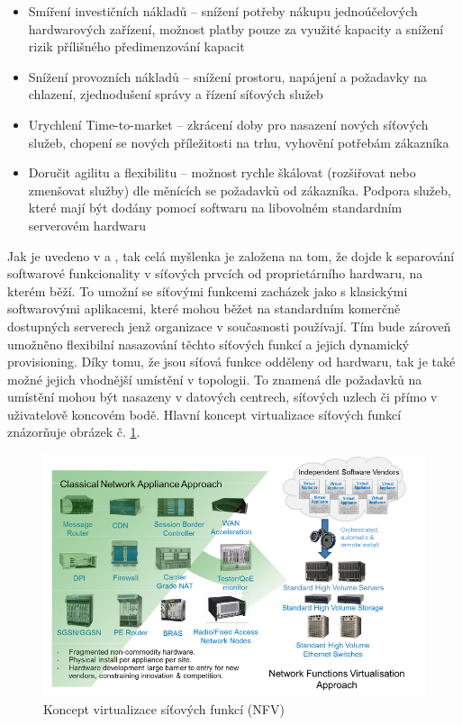 \begin{itemize}
\item Smíření investičních nákladů – snížení potřeby nákupu jednoúčelových hardwarových zařízení, možnost platby pouze za využité kapacity a snížení rizik přílišného předimenzování kapacit
\item Snížení provozních nákladů – snížení prostoru, napájení a požadavky na chlazení, zjednodušení správy a řízení síťových služeb
\item Urychlení Time-to-market – zkrácení doby pro nasazení nových síťových služeb, chopení se nových příležitosti na trhu, vyhovění potřebám zákazníka
\item Doručit agilitu a flexibilitu – možnost rychle škálovat (rozšiřovat nebo zmenšovat služby) dle měnících se požadavků od zákazníka. Podpora služeb, které mají být dodány pomocí softwaru na libovolném standardním serverovém hardwaru
\end{itemize}

Jak je uvedeno v \cite{NFVState} a \cite{NFVChalanges}, tak celá myšlenka je založena na tom, že dojde k separování softwarové funkcionality v síťových prvcích od proprietárního hardwaru, na kterém běží. To umožní se síťovými funkcemi zacházek jako s klasickými softwarovými aplikacemi, které mohou běžet na standardním komerčně dostupných serverech jenž organizace v současnosti používají. Tím bude zároveň umožněno flexibilní nasazování těchto síťových funkcí a jejich dynamický provisioning. Díky tomu, že jsou síťová funkce odděleny od hardwaru, tak je také možné jejich vhodnější umístění v topologii. To znamená dle požadavků na umístění mohou být nasazeny v datových centrech, síťových uzlech či přímo v uživatelově koncovém bodě. Hlavní koncept virtualizace síťových funkcí znázorňuje obrázek č. \ref{fig:vize_NFV}. 

\begin{figure}[h]
\begin{centering}
\includegraphics[scale=0.5]{images/vize_NFV}
\par\end{centering}
\caption{Koncept virtualizace síťových funkcí (NFV)\label{fig:vize_NFV}}
\end{figure}

